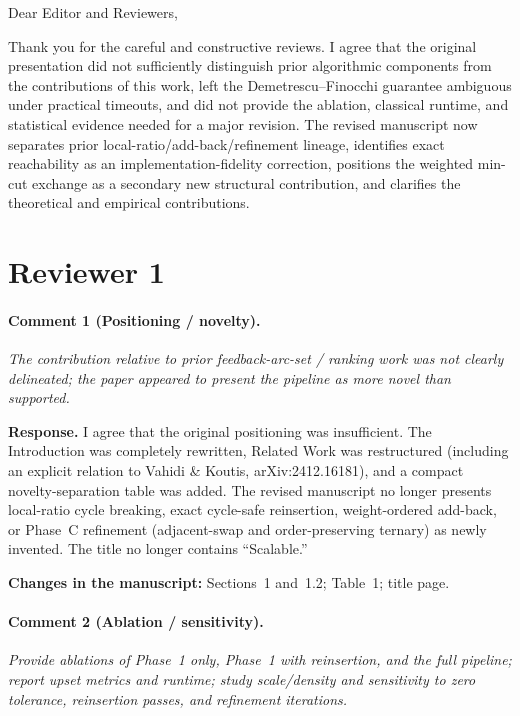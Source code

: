 \documentclass[11pt]{article}
\newcommand{\commentbox}[1]{\par\textit{#1}\par\medskip}
\newcommand{\changes}[1]{\textbf{Changes in the manuscript:} #1\par\medskip}
\begin{document}
Dear Editor and Reviewers,

Thank you for the careful and constructive reviews. I agree that the original presentation did not sufficiently distinguish prior algorithmic components from the contributions of this work, left the Demetrescu--Finocchi guarantee ambiguous under practical timeouts, and did not provide the ablation, classical runtime, and statistical evidence needed for a major revision. The revised manuscript now separates prior local-ratio/add-back/refinement lineage, identifies exact reachability as an implementation-fidelity correction, positions the weighted min-cut exchange as a secondary new structural contribution, and clarifies the theoretical and empirical contributions.

\section*{Reviewer 1}

\paragraph{Comment 1 (Positioning / novelty).}
\commentbox{The contribution relative to prior feedback-arc-set / ranking work was not clearly delineated; the paper appeared to present the pipeline as more novel than supported.}

\noindent\textbf{Response.}
I agree that the original positioning was insufficient. The Introduction was completely rewritten, Related Work was restructured (including an explicit relation to Vahidi \& Koutis, arXiv:2412.16181), and a compact novelty-separation table was added. The revised manuscript no longer presents local-ratio cycle breaking, exact cycle-safe reinsertion, weight-ordered add-back, or Phase~C refinement (adjacent-swap and order-preserving ternary) as newly invented. The title no longer contains ``Scalable.''

\changes{Sections~1 and~1.2; Table~1; title page.}

\paragraph{Comment 2 (Ablation / sensitivity).}
\commentbox{Provide ablations of Phase~1 only, Phase~1 with reinsertion, and the full pipeline; report upset metrics and runtime; study scale/density and sensitivity to zero tolerance, reinsertion passes, and refinement iterations.}
\end{document}
